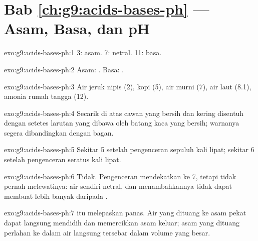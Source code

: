 \section*{Bab \ref{ch:g9:acids-bases-ph} --- Asam, Basa, dan pH}

\begin{solution}{exo:g9:acids-bases-ph:1}
 3: asam.  7: netral.  11: basa.
\end{solution}

\begin{solution}{exo:g9:acids-bases-ph:2}
Asam:  . Basa:  .
\end{solution}

\begin{solution}{exo:g9:acids-bases-ph:3}
Air jeruk nipis (2), kopi (5), air murni (7), air laut (8.1), amonia
rumah tangga (12).
\end{solution}

\begin{solution}{exo:g9:acids-bases-ph:4}
Secarik  di atas cawan yang bersih dan kering disentuh dengan
setetes larutan yang dibawa oleh batang kaca yang bersih; warnanya
segera dibandingkan dengan bagan.
\end{solution}

\begin{solution}{exo:g9:acids-bases-ph:5}
Sekitar 5 setelah pengenceran sepuluh kali lipat; sekitar 6 setelah
pengenceran seratus kali lipat.
\end{solution}

\begin{solution}{exo:g9:acids-bases-ph:6}
Tidak. Pengenceran mendekatkan  ke 7, tetapi tidak pernah
melewatinya: air sendiri netral, dan menambahkannya tidak dapat membuat
  lebih banyak daripada  .
\end{solution}

\begin{solution}{exo:g9:acids-bases-ph:7}
 itu melepaskan panas. Air yang dituang ke asam pekat dapat
langsung mendidih dan memercikkan asam keluar; asam yang dituang
perlahan ke dalam air langsung tersebar dalam volume yang besar.
\end{solution}

